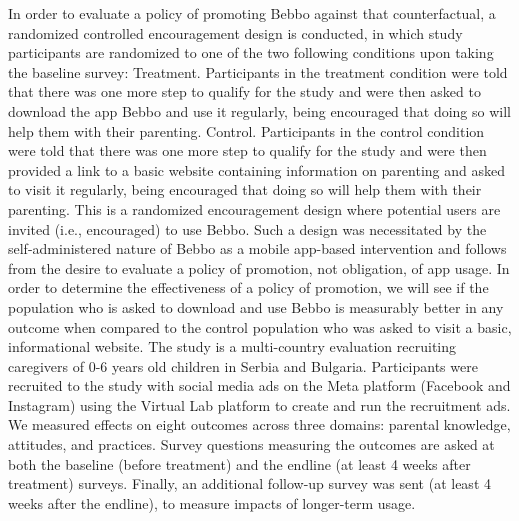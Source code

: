 \documentclass{article}
\begin{document}
In order to evaluate a policy of promoting Bebbo against that counterfactual, a randomized controlled encouragement design is conducted, in which study participants are randomized to one of the two following conditions upon taking the baseline survey:
Treatment. Participants in the treatment condition were told that there was one more step to qualify for the study and were then asked to download the app Bebbo and use it regularly, being encouraged that doing so will help them with their parenting.
Control. Participants in the control condition were told that there was one more step to qualify for the study and were then provided a link to a basic website containing information on parenting and asked to visit it regularly, being encouraged that doing so will help them with their parenting.
This is a randomized encouragement design where potential users are invited (i.e., encouraged) to use Bebbo. Such a design was necessitated by the self-administered nature of Bebbo as a mobile app-based intervention and follows from the desire to evaluate a policy of promotion, not obligation, of app usage.
In order to determine the effectiveness of a policy of promotion, we will see if the population who is asked to download and use Bebbo is measurably better in any outcome when compared to the control population who was asked to visit a basic, informational website. The study is a multi-country evaluation recruiting caregivers of 0-6 years old children in Serbia and Bulgaria. Participants were recruited to the study with social media ads on the Meta platform (Facebook and Instagram) using the Virtual Lab platform to create and run the recruitment ads.
We measured effects on eight outcomes across three domains: parental knowledge, attitudes, and practices. Survey questions measuring the outcomes are asked at both the baseline (before treatment) and the endline (at least 4 weeks after treatment) surveys. Finally, an additional follow-up survey was sent (at least 4 weeks after the endline), to measure impacts of longer-term usage.
\end{document}
